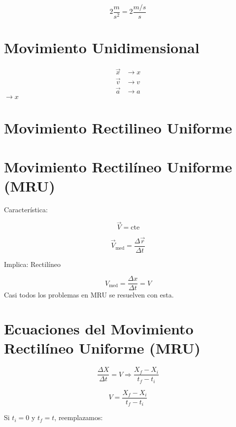 \begin{equation}
2 \frac{m}{s^2} = 2 \frac{m/s}{s}
\end{equation}

\section*{Movimiento Unidimensional}
\begin{align*}
\vec{x} &\rightarrow x \\
\vec{v} &\rightarrow v \\
\vec{a} &\rightarrow a
\end{align*}
$\rightarrow x$

\newpage
\section{Movimiento Rectilineo Uniforme}
\section*{Movimiento Rectil\'ineo Uniforme (MRU)}
Caracter\'istica:

\begin{equation}
\vec{V} = \text{cte}
\end{equation}

\begin{equation}
\vec{V}_{\text{med}} = \frac{\Delta \vec{r}}{\Delta t}
\end{equation}

Implica: Rectil\'ineo

\begin{equation}
V_{\text{med}} = \frac{\Delta x}{\Delta t} = V
\end{equation}
Casi todos los problemas en MRU se resuelven con esta.

\section*{Ecuaciones del Movimiento Rectil\'ineo Uniforme (MRU)}

\begin{equation}
\frac{\Delta X}{\Delta t} = V \Rightarrow \frac{X_f - X_i}{t_f - t_i}
\end{equation}

\begin{equation}
V = \frac{X_f - X_i}{t_f - t_i}
\end{equation}

Si $t_i = 0$ y $t_f = t$, reemplazamos:

